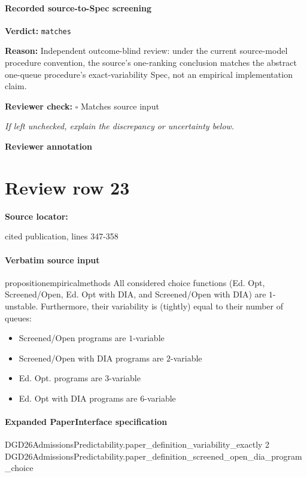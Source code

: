 \documentclass[10pt]{article}
\newcommand{\reviewerbox}{%
  \par\noindent\fbox{\parbox{0.96\linewidth}{\rule{0pt}{0.38in}}}\par
}
\newcommand{\reviewmatch}[1]{%
  \par\noindent\textbf{Reviewer check:} $\square$\; #1\par
  \noindent\emph{If left unchecked, explain the discrepancy or uncertainty below.}\par
}
\begin{document}
\paragraph{Recorded source-to-Spec screening}
\textbf{Verdict:} \texttt{matches}
\\
{\raggedright
\textbf{Reason:} Independent outcome-\allowbreak{}blind review:\allowbreak{} under the current source-\allowbreak{}model procedure convention, the source's one-\allowbreak{}ranking conclusion matches the abstract one-\allowbreak{}queue procedure's exact-\allowbreak{}variability Spec, not an empirical implementation claim.\allowbreak{}
\par}
\reviewmatch{Matches source input}
\noindent\textbf{Reviewer annotation}\par
\reviewerbox
\clearpage
\hypertarget{source-claim-8afe5dc5804dcb73}{}
\section*{Review row 23}
\textbf{Source locator:} {\footnotesize\raggedright cited publication, lines 347-\allowbreak{}358\par}
\paragraph{Verbatim source input}
\begin{ReviewVerbatim}
\begin{restatable}[]{proposition}{empiricalmethods}
\label{prop:program-variability}
All considered choice functions ({Ed. Opt}, {Screened/Open}, {Ed. Opt with DIA}, and {Screened/Open with DIA}) are $1$-unstable. Furthermore, their variability is (tightly) equal to their number of queues:

\begin{itemize}[noitemsep,topsep=0pt,parsep=0pt,partopsep=0pt]
    \item Screened/Open programs are $1$-variable
    \item Screened/Open with DIA programs are $2$-variable
    \item Ed. Opt. programs are $3$-variable
    \item Ed. Opt with DIA programs are $6$-variable
\end{itemize}

\end{restatable}
\end{ReviewVerbatim}



\paragraph{Expanded PaperInterface specification}
\begin{ReviewVerbatim}
DGD26AdmissionsPredictability.paper_definition_variability_exactly 2
  DGD26AdmissionsPredictability.paper_definition_screened_open_dia_program_choice
\end{ReviewVerbatim}
\end{document}
